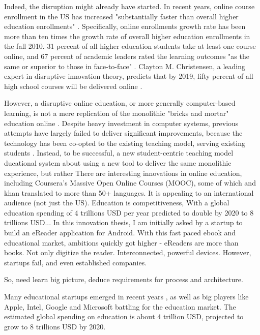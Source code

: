 \documentclass[a4paper,10pt]{article}
\begin{document}
Indeed, the disruption might already have started. In recent years, online course enrollment in the US has increased 
"substantially faster than overall higher education enrollments" \cite{babsonOnlineEduGrowth2011}. Specifically, online 
enrollments growth rate has been more than ten times the growth rate of overall higher education enrollments in the fall 2010. 
31 percent of all higher education 
students take at least  one course online, and 67 percent of academic leaders rated the learning outcomes 
"as the same or superior to those in face-to-face" \cite{babsonOnlineEduGrowth2011}. 
Clayton M. Christensen, a leading expert in disruptive innovation theory, predicts that by 2019,
fifty percent of all high school courses will be delivered online \cite{DisruptingClassExpandedEdition}.

However, a disruptive online education, or more generally computer-based learning, is not a mere replication of the monolithic 
"bricks and mortar" education online \cite{DisruptingClassExpandedEdition}. Despite heavy investment in computer systems, previous attempts have 
largely failed to deliver significant improvements, because the technology has been co-opted to the existing teaching model, serving 
existing students \cite{DisruptingClassExpandedEdition}. 
Instead, to be successful, a new student-centric teaching model ducational system 
about using a new tool to deliver the same monolithic experience, 
but rather
There are interesting innovations in online education, including Coursera's Massive Open Online Courses (MOOC), some of which 
and khan translated to more than 50+ languages. It is appealing to an international audience (not just the US).
Education is competitiveness, 
With a global education spending of 4 trillions USD per year predicted to double by 2020 to 8 trillions USD...
In this innovation thesis, I am initially asked by a startup to build an eReader application for Android. With this fast paced ebook and educational market,
ambitions quickly got higher - eReaders are more than books. Not only digitize the reader. Interconnected, powerful devices.
However, startups fail, and even established companies.

So, need learn big picture, deduce requirements for process and architecture.

Many educational startups emerged in recent years \cite{boomEducation1}\cite{boomEducation2}, as well as big players like Apple, Intel, 
Google and Microsoft battling for the education market. The estimated global spending on education is about 4 trillion USD, projected to grow to
8 trillions USD by 2020.
\end{document}
